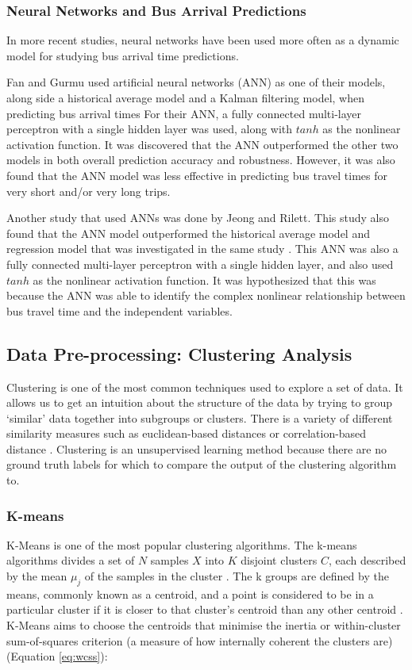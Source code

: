 \subsubsection{Neural Networks and Bus Arrival Predictions}

In more recent studies, neural networks have been used more often as a dynamic model for studying bus arrival time predictions. 

Fan and Gurmu used artificial neural networks (ANN) as one of their models, along side a historical average model and a Kalman filtering model, when predicting bus arrival times \cite{dynamic-gps}  For their ANN, a fully connected multi-layer perceptron with a single hidden layer was used, along with $tanh$ as the nonlinear activation function. It was discovered that the ANN outperformed the other two models in both overall prediction accuracy and robustness. However, it was also found that the ANN model was less effective in predicting bus travel times for very short and/or very long trips.

Another study that used ANNs was done by Jeong and Rilett. This study also found that the ANN model outperformed the historical average model and regression model that was investigated in the same study \cite{ann-prediction}. This ANN was also a fully connected multi-layer perceptron with a single hidden layer, and also used $tanh$ as the nonlinear activation function. It was hypothesized that this was because the ANN was able to identify the complex nonlinear relationship between bus travel time and the independent variables. 

\subsection{Data Pre-processing: Clustering Analysis}

Clustering is one of the most common techniques used to explore a set of data. It allows us to get an intuition about the structure of the data by trying to group `similar' data together into subgroups or clusters. There is a variety of different similarity measures such as euclidean-based distances or correlation-based distance \cite{k-means-towards-ds}. Clustering is an unsupervised learning method because there are no ground truth labels for which to compare the output of the clustering algorithm to.

\subsubsection{K-means}
K-Means is one of the most popular clustering algorithms. The k-means algorithms divides a set of $N$ samples $X$ into $K$ disjoint clusters $C$, each described by the mean $\mu_j$ of the samples in the cluster \cite{k-means-sklearn}. The k groups are defined by the means, commonly known as a centroid, and a point is considered to be in a particular cluster if it is closer to that cluster's centroid than any other centroid \cite{k-means-stanford-notes}. K-Means aims to choose the centroids that minimise the inertia or within-cluster sum-of-squares criterion (a measure of how internally coherent the clusters are) (Equation \ref{eq:wcss}): 

